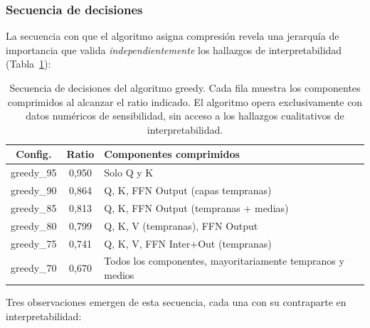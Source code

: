 \subsubsection{Secuencia de decisiones}

La secuencia con que el algoritmo asigna compresión revela una jerarquía
de importancia que valida \emph{independientemente} los hallazgos de
interpretabilidad (Tabla~\ref{tab:greedy-sequence}):

\begin{table}[ht]
\centering
\caption{Secuencia de decisiones del algoritmo greedy. Cada fila muestra
los componentes comprimidos al alcanzar el ratio indicado. El algoritmo
opera exclusivamente con datos numéricos de sensibilidad, sin acceso a
los hallazgos cualitativos de interpretabilidad.}
\label{tab:greedy-sequence}
\small
\begin{tabular}{ccp{8.0cm}}
\toprule
\textbf{Config.} & \textbf{Ratio} & \textbf{Componentes comprimidos} \\
\midrule
greedy\_95 & 0{,}950 & Solo Q y K \\
greedy\_90 & 0{,}864 & Q, K, FFN Output (capas tempranas) \\
greedy\_85 & 0{,}813 & Q, K, FFN Output (tempranas + medias) \\
greedy\_80 & 0{,}799 & Q, K, V (tempranas), FFN Output \\
greedy\_75 & 0{,}741 & Q, K, V, FFN Inter+Out (tempranas) \\
greedy\_70 & 0{,}670 & Todos los componentes, mayoritariamente
                       tempranos y medios \\
\bottomrule
\end{tabular}
\end{table}

Tres observaciones emergen de esta secuencia, cada una con su contraparte
en interpretabilidad:

